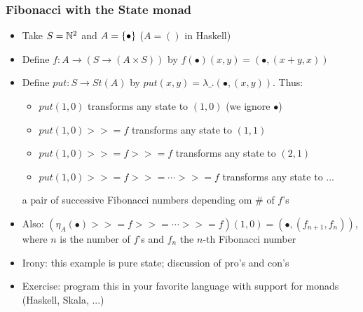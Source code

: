 \documentclass[handout]{beamer}
\newcommand{\bind}{{>}\!\!{>}\!{=}}
\begin{document}
\frame
  {   
    \frametitle{Fibonacci with the State monad}\label{Mon5:FibState}

 \begin{itemize}[<+->]
\item Take $S=\mathbb{N}^2$ and $A=\{\bullet\}$ ($A=()$ in Haskell) 
\item Define $f: A\to (S\to (A\times S))$ by $f(\bullet)(x,y) = (\bullet,(x+y,x))$
\item Define $put: S\to St(A)$ by $put(x,y) = \lambda\_.(\bullet,(x,y))$. Thus:
 \begin{itemize}
    \item $put(1,0)$ transforms any state to $(1,0)$ (we ignore $\bullet$)
    \item $put(1,0) \bind f$ transforms any state to $(1,1)$
    \item $put(1,0) \bind f \bind f$ transforms any state to $(2,1)$
    \item $put(1,0) \bind f \bind \cdots \bind f$  transforms any state to ...
 \end{itemize}
a pair of successive Fibonacci numbers depending om \# of $f$'s
\item Also: $(\eta_A(\bullet) \bind f \bind \cdots \bind f)(1,0) = (\bullet,(f_{n+1},f_n))$,
where $n$ is the number of $f$'s and $f_n$ the $n$-th Fibonacci number
\item Irony: this example is pure state; discussion of pro's and con's
\item Exercise: program this in your favorite language with support for monads
(Haskell, Skala, ...)
 \end{itemize}
 }
\end{document}
